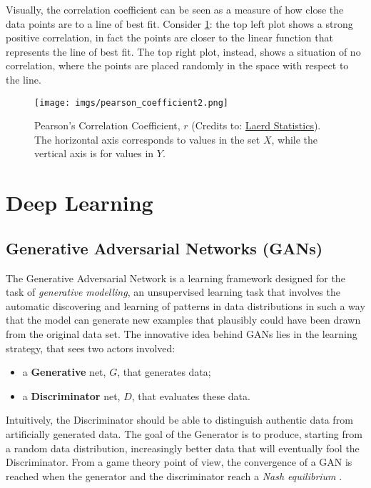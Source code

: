 \documentclass[target=mst,aauheader=aics]{thud}
\theoremstyle{definition}
\begin{document}
Visually, the correlation coefficient can be seen as a measure of how close the data points are to a line of best fit. Consider \ref{fig:pearson}: the top left plot shows a strong positive correlation, in fact the points are closer to the linear function that represents the line of best fit. The top right plot, instead, shows a situation of no correlation, where the points are placed randomly in the space with respect to the line.

\begin{figure}
	\centering
	\texttt{[image: imgs/pearson\_coefficient2.png]}
	\captionsetup{width=0.7\textwidth}
	\caption{Pearson's Correlation Coefficient, $r$ (Credits to: \href{https://statistics.laerd.com/statistical-guides/pearson-correlation-coefficient-statistical-guide.php}{Laerd Statistics}). The horizontal axis corresponds to values in the set $X$, while the vertical axis is for values in $Y$.}
	\label{fig:pearson}
\end{figure}

\chapter{Deep Learning}\label{appendix:dl}
\section{Generative Adversarial Networks (GANs)}
The Generative Adversarial Network \cite{Goodfellow2014} is a learning framework designed for the task of \textit{generative modelling}, an unsupervised learning task that involves the automatic discovering and learning of patterns in data distributions in such a way that the model can generate new examples that plausibly could have been drawn from the original data set. The innovative idea behind GANs lies in the learning strategy, that sees two actors involved:
\begin{itemize}
	\item a \textbf{Generative} net, $G$, that generates data;
	\item a \textbf{Discriminator} net, $D$, that evaluates these data.
\end{itemize}
Intuitively, the Discriminator should be able to distinguish authentic data from artificially generated data. The goal of the Generator is to produce, starting from a random data distribution, increasingly better data that will eventually fool the Discriminator. From a game theory point of view, the convergence of a GAN is reached when the generator and the discriminator reach a \textit{Nash equilibrium} \cite{Ratliff2013}.
\end{document}
